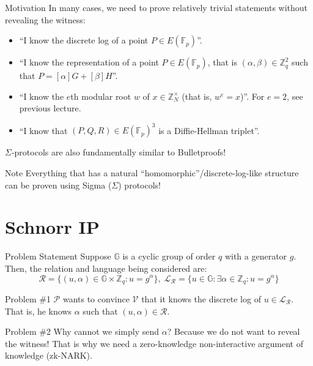 \documentclass{zkdl-presentation-template}
\begin{document}
    \begin{frame}{Motivation}
        In many cases, we need to prove relatively trivial statements without revealing the witness:
        \begin{itemize}
            \item ``I know the discrete log of a point $P \in E(\mathbb{F}_p)$''.
            \item ``I know the representation of a point $P \in E(\mathbb{F}_p)$, that is $(\alpha,\beta) \in \mathbb{Z}_q^2$ such that $P=[\alpha]G + [\beta]H$''.
            \item ``I know the $e$th modular root $w$ of $x \in \mathbb{Z}_N^{\times}$ (that is, $w^e=x$)''. \textcolor{oc-orange-8}{For $e=2$, see previous lecture.}
            \item ``I know that $(P,Q,R) \in E(\mathbb{F}_p)^3$ is a Diffie-Hellman triplet''.
        \end{itemize}

        $\Sigma$-protocols are also fundamentally similar to Bulletproofs!

        \begin{alertblock}{Note}
            Everything that has a natural ``homomorphic''/discrete-log-like structure can be proven using Sigma ($\Sigma$) protocols!
        \end{alertblock}
    \end{frame}

    \section{Schnorr IP}

    \begin{frame}{Problem Statement}
        Suppose $\mathbb{G}$ is a cyclic group of order $q$ with a generator $g$. Then, the relation and language being considered are:
        \begin{equation*}
            \mathcal{R} = \{(u, \alpha) \in \mathbb{G} \times \mathbb{Z}_q: u = g^{\alpha}\}, \; \mathcal{L}_{\mathcal{R}} = \{u \in \mathbb{G}: \exists \alpha \in \mathbb{Z}_q: u = g^{\alpha}\}
        \end{equation*}

        \begin{block}{Problem \#1}
            $\mathcal{P}$ wants to convince $\mathcal{V}$ that it knows the discrete log of $u \in \mathcal{L}_{\mathcal{R}}$. That is, he knows $\alpha$ such that $(u,\alpha) \in \mathcal{R}$.
        \end{block}

        \begin{block}{Problem \#2}
            Why cannot we simply send $\alpha$? Because we do not want to reveal the witness! That is why we need a zero-knowledge non-interactive argument of knowledge (zk-NARK).
        \end{block}
    \end{frame}
\end{document}
